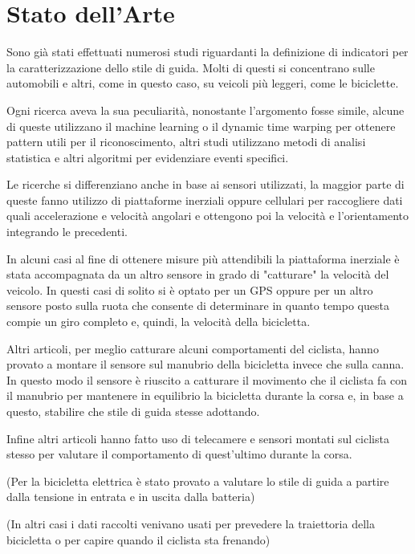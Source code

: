 \documentclass[class=article]{standalone}
\begin{document}
	\section{Stato dell'Arte}
	Sono già stati effettuati numerosi studi riguardanti la definizione di indicatori per la caratterizzazione dello stile di guida.
	Molti di questi si concentrano sulle automobili e altri, come in questo caso, su veicoli più leggeri, come le biciclette.
	
	Ogni ricerca aveva la sua peculiarità, nonostante l'argomento fosse simile, alcune di queste utilizzano il machine learning o il dynamic time warping per ottenere pattern utili per il riconoscimento, altri studi utilizzano metodi di analisi statistica e altri algoritmi per evidenziare eventi specifici.
	
	Le ricerche si differenziano anche in base ai sensori utilizzati, la maggior parte di queste fanno utilizzo di piattaforme inerziali oppure cellulari per raccogliere dati quali accelerazione e velocità angolari e ottengono poi la velocità e l'orientamento integrando le precedenti.
	
	In alcuni casi al fine di ottenere misure più attendibili la piattaforma inerziale è stata accompagnata da un altro sensore in grado di "catturare" la velocità del veicolo. In questi casi di solito si è optato per un GPS oppure per un altro sensore posto sulla ruota che consente di determinare in quanto tempo questa compie un giro completo e, quindi, la velocità della bicicletta.
	
	Altri articoli, per meglio catturare alcuni comportamenti del ciclista, hanno provato a montare il sensore sul manubrio della bicicletta invece che sulla canna. In questo modo il sensore è riuscito a catturare il movimento che il ciclista fa con il manubrio per mantenere in equilibrio la bicicletta durante la corsa e, in base a questo, stabilire che stile di guida stesse adottando.
	
	Infine altri articoli hanno fatto uso di telecamere e sensori montati sul ciclista stesso per valutare il comportamento di quest'ultimo durante la corsa.\hfill\break
	
	
	(Per la bicicletta elettrica è stato provato a valutare lo stile di guida a partire dalla tensione in entrata e in uscita dalla batteria)
	
	(In altri casi i dati raccolti venivano usati per prevedere la traiettoria della bicicletta o per capire quando il ciclista sta frenando)
	
	
	
	
	
\end{document}
